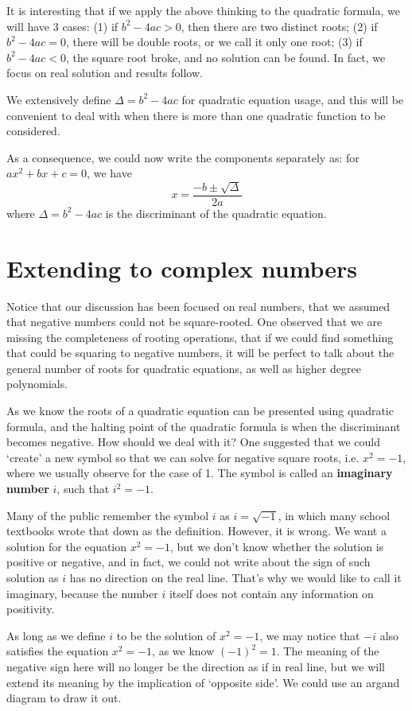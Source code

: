 \documentclass[12pt]{article}
\begin{document}
    It is interesting that if we apply the above thinking to the quadratic formula, we will have 3 cases: (1) if $b^2-4ac>0$, then there are two distinct roots; (2) if $b^2-4ac=0$, there will be double roots, or we call it only one root; (3) if $b^2-4ac<0$, the square root broke, and no solution can be found. In fact, we focus on real solution and results follow.

    We extensively define $\Delta=b^2-4ac$ for quadratic equation usage, and this will be convenient to deal with when there is more than one quadratic function to be considered.

    As a consequence, we could now write the components separately as: for $ax^2+bx+c=0$, we have $$x=\frac{-b\pm\sqrt{\Delta}}{2a}$$ where $\Delta=b^2-4ac$ is the discriminant of the quadratic equation.

    \section*{Extending to complex numbers}
    Notice that our discussion has been focused on real numbers, that we assumed that negative numbers could not be square-rooted. One observed that we are missing the completeness of rooting operations, that if we could find something that could be squaring to negative numbers, it will be perfect to talk about the general number of roots for quadratic equations, as well as higher degree polynomials.

    As we know the roots of a quadratic equation can be presented using quadratic formula, and the halting point of the quadratic formula is when the discriminant becomes negative. How should we deal with it? One suggested that we could `create' a new symbol so that we can solve for negative square roots, i.e. $x^2=-1$, where we usually observe for the case of 1. The symbol is called an \textbf{imaginary number} $i$, such that $i^2=-1$.

    Many of the public remember the symbol $i$ as $i=\sqrt{-1}$, in which many school textbooks wrote that down as the definition. However, it is wrong. We want a solution for the equation $x^2=-1$, but we don't know whether the solution is positive or negative, and in fact, we could not write about the sign of such solution as $i$ has no direction on the real line. That's why we would like to call it imaginary, because the number $i$ itself does not contain any information on positivity.

    As long as we define $i$ to be the solution of $x^2=-1$, we may notice that $-i$ also satisfies the equation $x^2=-1$, as we know $(-1)^2=1$. The meaning of the negative sign here will no longer be the direction as if in real line, but we will extend its meaning by the implication of `opposite side'. We could use an argand diagram to draw it out.
\end{document}
